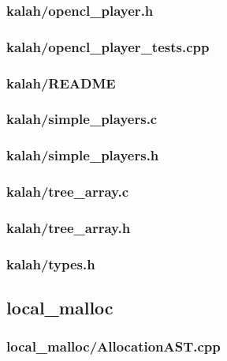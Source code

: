 \documentclass{article}
\begin{document}
\subsubsection*{kalah/opencl\_player.h}


\subsubsection*{kalah/opencl\_player\_tests.cpp}


\subsubsection*{kalah/README}


\subsubsection*{kalah/simple\_players.c}


\subsubsection*{kalah/simple\_players.h}


\subsubsection*{kalah/tree\_array.c}


\subsubsection*{kalah/tree\_array.h}


\subsubsection*{kalah/types.h}


\subsection*{local\_malloc}
\subsubsection*{local\_malloc/AllocationAST.cpp}

\end{document}
